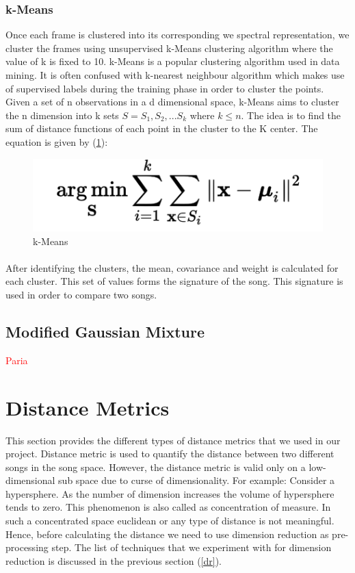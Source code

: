 \documentclass[12pt]{article}
\begin{document}
\subsubsection{k-Means}
Once each frame is clustered into its corresponding we spectral representation, we cluster the frames using unsupervised k-Means clustering algorithm where the value of k is  fixed to 10. k-Means is a popular clustering algorithm used in data mining. It is often confused with k-nearest neighbour algorithm which makes use of supervised labels during the training phase in order to cluster the points. Given a set of n observations in a d dimensional space, k-Means aims to cluster the n dimension into k sets $S = {S_1,S_2,...S_k}$ where $ k \leq n$. The idea is to find the sum of distance functions of each point in the cluster to the K center. The equation is given by (\ref{kmeans}):

\begin{figure}[h]\label{kmeans}
\center
\includegraphics{fig2.png}
\caption{k-Means}
\end{figure}

\paragraph{}
After identifying the clusters, the mean, covariance and weight is calculated for each cluster. This set of values forms the signature of the song. This signature is used in order to compare two songs.

\subsection{Modified Gaussian Mixture} \textcolor{red}{Paria}

\section{Distance Metrics}
This section provides the different types of distance metrics that we used in our project. Distance metric is used to quantify the distance between two different songs in the song space. However, the distance metric is valid only on a low-dimensional sub space due to curse of dimensionality. For example: Consider a hypersphere. As the number of dimension increases the volume of hypersphere tends to zero. This phenomenon is also called as concentration of measure. In such a concentrated space euclidean or any type of distance is not meaningful. Hence, before calculating the distance we need to use dimension reduction as pre-processing step. The list of techniques that we experiment with for dimension reduction is discussed in the previous section (\ref{dr}).
\end{document}
